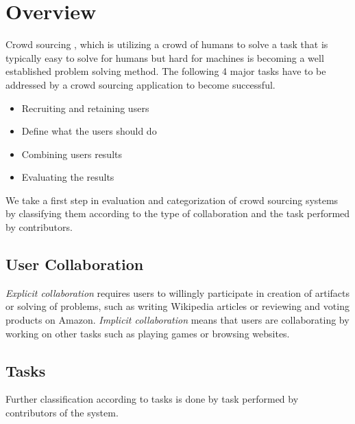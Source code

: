 \documentclass{sig-alternate}
\begin{document}



\section{Overview}
Crowd sourcing \cite{books/daglib/0031386}, which is utilizing a crowd of humans to solve a task that is typically easy to solve for humans but hard for machines is becoming a well established problem solving method. The following 4 major tasks have to be addressed by a crowd sourcing application to become successful.
\begin{itemize}
\item Recruiting and retaining users
\item Define what the users should do
\item Combining users results
\item Evaluating the results
\end{itemize}
We take a first step in evaluation and categorization of crowd sourcing systems by classifying them according to the type of collaboration and the task performed by contributors.
\newline\newline
\subsection{User Collaboration}
\textit{Explicit collaboration} requires users to willingly participate in creation of artifacts or solving of problems, such as writing Wikipedia \cite{schuler_wikipedia-inside_2007} articles or reviewing and voting products on Amazon.
\newline\newline
\textit{Implicit collaboration} means that users are collaborating by working on other tasks such as playing games or browsing websites.
\subsection{Tasks}
Further classification according to tasks is done by task performed by contributors of the system.
\end{document}
